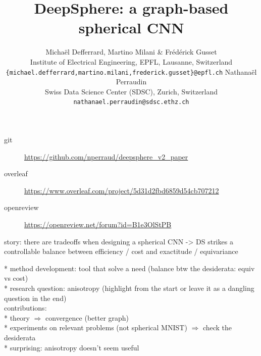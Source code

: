 \documentclass{article} %
\title{DeepSphere: a graph-based spherical CNN}
\author{Michaël Defferrard, Martino Milani \& Frédérick Gusset \\
Institute of Electrical Engineering, EPFL, Lausanne, Switzerland \\
\texttt{\{michael.defferrard,martino.milani,frederick.gusset\}@epfl.ch}
\AND
Nathanaël Perraudin \\
Swiss Data Science Center (SDSC), Zurich, Switzerland \\
\texttt{nathanael.perraudin@sdsc.ethz.ch}
}
\begin{document}
\begin{description}
	\item[git] \url{https://github.com/nperraud/deepsphere_v2_paper}
	\item[overleaf] \url{https://www.overleaf.com/project/5d31d2fbd6859d54cb707212}
	\item[openreview] \url{https://openreview.net/forum?id=B1e3OlStPB}
\end{description}

story: there are tradeoffs when designing a spherical CNN -> DS strikes a controllable balance between efficiency / cost and exactitude / equivariance

* method development: tool that solve a need (balance btw the desiderata: equiv vs cost)\\
* research question: anisotropy (highlight from the start or leave it as a dangling question in the end)\\

contributions:\\
* theory $\Rightarrow$ convergence (better graph)\\
* experiments on relevant problems (not spherical MNIST) $\Rightarrow$ check the desiderata\\
  * surprising: anisotropy doesn't seem useful\\
\end{document}
